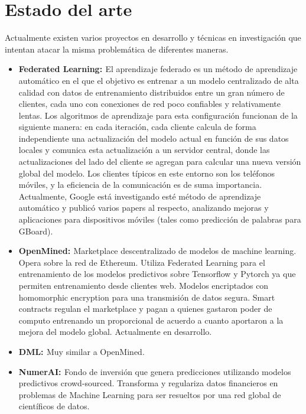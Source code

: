 \documentclass[
11pt, %
oneside, %
spanish, %
singlespacing, %
headsepline, %
chapterinoneline, %
]{MastersDoctoralThesis} %
\begin{document}
\chapter{Estado del arte}

Actualmente existen varios proyectos en desarrollo y técnicas en investigación que intentan atacar la misma problemática de diferentes maneras.

\begin{itemize}
\item \textbf{Federated Learning: \cite{fedlearn2}} El aprendizaje federado es un método de aprendizaje automático en el que el objetivo es entrenar a un modelo centralizado de alta calidad con datos de entrenamiento distribuidos entre un gran número de clientes, cada uno con conexiones de red poco confiables y relativamente lentas. Los algoritmos de aprendizaje para esta configuración funcionan de la siguiente manera: en cada iteración, cada cliente calcula de forma independiente una actualización del modelo actual en función de sus datos locales y comunica esta actualización a un servidor central, donde las actualizaciones del lado del cliente se agregan para calcular una nueva versión global del modelo. Los clientes típicos en este entorno son los teléfonos móviles, y la eficiencia de la comunicación es de suma importancia. Actualmente, Google está investigando \cite{fedlearn1} \cite{fedlearn3} \cite{fedlearn4} \cite{fedlearn5} \cite{fedlearn6} esté método de aprendizaje automático y publicó varios papers al respecto, analizando mejoras y aplicaciones para dispositivos móviles (tales como predicción de palabras para GBoard).

\item \textbf{OpenMined: \cite{om}} Marketplace descentralizado de modelos de machine learning. Opera sobre la red de Ethereum. Utiliza Federated Learning para el entrenamiento de los modelos predictivos sobre Tensorflow y Pytorch ya que permiten entrenamiento desde clientes web. Modelos encriptados con homomorphic encryption \cite{homenc} para una transmisión de datos segura. 
Smart contracts regulan el marketplace y pagan a quienes gastaron poder de computo entrenando un proporcional de acuerdo a cuanto aportaron a la mejora del modelo global.
Actualmente en desarrollo.

\item \textbf{DML: \cite{dml}} Muy similar a OpenMined.

\item \textbf{NumerAI: \cite{nai}} Fondo de inversión que genera predicciones utilizando modelos predictivos crowd-sourced. Transforma y regulariza datos financieros en problemas de Machine Learning para ser resueltos por una red global de científicos de datos.


\end{itemize}
\end{document}
